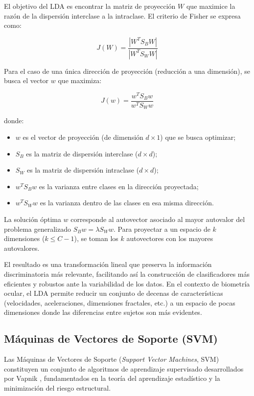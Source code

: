 El objetivo del LDA es encontrar la matriz de proyección $W$ que maximice la razón de la dispersión interclase a la intraclase. El criterio de Fisher se expresa como:

\begin{equation}
	J(W) = \frac{|W^T S_B W|}{|W^T S_W W|} \tag{11}
\end{equation}

Para el caso de una única dirección de proyección (reducción a una dimensión), se busca el vector $w$ que maximiza:

\begin{equation}
	J(w) = \frac{w^T S_B w}{w^T S_W w} \tag{12}
\end{equation}

donde:
\begin{itemize}
	\item $w$ es el vector de proyección (de dimensión $d \times 1$) que se busca optimizar;
	\item $S_B$ es la matriz de dispersión interclase ($d \times d$);
	\item $S_W$ es la matriz de dispersión intraclase ($d \times d$);
	\item $w^T S_B w$ es la varianza entre clases en la dirección proyectada;
	\item $w^T S_W w$ es la varianza dentro de las clases en esa misma dirección.
\end{itemize}

La solución óptima $w$ corresponde al autovector asociado al mayor autovalor del problema generalizado $S_B w = \lambda S_W w$. Para proyectar a un espacio de $k$ dimensiones ($k \leq C-1$), se toman los $k$ autovectores con los mayores autovalores.

El resultado es una transformación lineal que preserva la información discriminatoria más relevante, facilitando así la construcción de clasificadores más eficientes y robustos ante la variabilidad de los datos. En el contexto de biometría ocular, el LDA permite reducir un conjunto de decenas de características (velocidades, aceleraciones, dimensiones fractales, etc.) a un espacio de pocas dimensiones donde las diferencias entre sujetos son más evidentes.


\subsection{Máquinas de Vectores de Soporte (SVM)}

Las Máquinas de Vectores de Soporte (\textit{Support Vector Machines}, SVM) constituyen un conjunto de algoritmos de aprendizaje supervisado desarrollados por Vapnik \cite{vapnik1995}, fundamentados en la teoría del aprendizaje estadístico y la minimización del riesgo estructural. 

